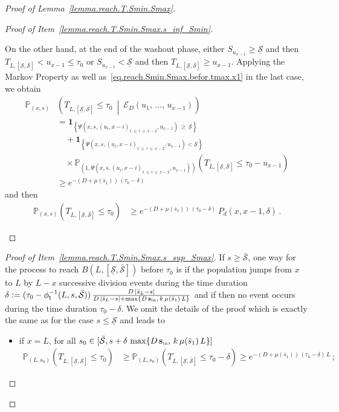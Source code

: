 \documentclass[AHL,Unicode,longabstracts,published]{cedram}
\newcommand{\PP}{\mathbb{P}}
\newcommand{\clE}{\mathcal{E}}
\newcommand{\Sin}{{\mathbf s}_{\textrm{\tiny\rm in}}}
\newcommand{\Smin}{\underline{\mathcal{S}}}
\newcommand{\Smax}{\bar{\mathcal{S}}}
\newcommand{\barmu}{\mu(\bar s_1)}
\newcommand{\phit}{\phi_\textsf{t}^{-1}}
\newcommand{\1}{\mathbf{1}}
\begin{document}
\begin{proof}[Proof of Lemma~\ref{lemma.reach.T.Smin.Smax}]
\begin{proof}[{Proof of Item~\eqref{lemma.reach.T.Smin.Smax.s_inf_Smin}}]
\begin{itemize}
On the other hand, at the end of the washout phase, either $S_{u_{x-1}}\geq \Smin$ and then $T_{L,[\Smin,\Smax]}< u_{x-1}\leq\tau_0$ or $S_{u_{x-1}}< \Smin$ and then $T_{L,[\Smin,\Smax]}\geq u_{x-1}$. Applying the Markov Property as well as~\eqref{eq.reach.Smin.Smax.befor.tmax.x1} in the last case, we obtain
\begin{align*}
\PP_{(x,s)}
&\left(T_{L,\left[\Smin,\Smax\right]}\leq\tau_0 \ \middle| \ \clE_D\left(u_1,\,\dots,\,u_{x-1}\right) \right)
\\
&= \1_{\left\{\Psi\left(x,s,(u_i,x-i)_{1\,\leq\,i\,\leq\,x-2},u_{x-1}\right)\,\geq\,\Smin\right\}}\\
&\quad + \1_{\left\{\Psi\left(x,s,(u_i,x-i)_{1\,\leq\,i\,\leq \,x-2},u_{x-1}\right)< \Smin\right\}}\,
\\
&\quad
\times \PP_{\left(1,\Psi\left(x,s,(u_i,x-i)_{1\,\leq\,i\,\leq\,x-2},u_{x-1}\right)\right)}
\left(T_{L,[\Smin,\Smax]}\leq\tau_0-u_{x-1}\right)
\\ 
&\geq e^{-(D+\barmu)\,(\tau_0-\delta)}
\end{align*}
and then
\begin{align}\label{eq.reach.Smin.Smax.befor.tmax.xlarger1}
\PP_{(x,s)}\left(T_{L,[\Smin,\Smax]}\leq \tau_0\right) &\geq e^{-(D+\barmu)\,(\tau_0-\delta)}\,P_d(x,x-1,\delta)\,.
\end{align}
\end{itemize}\let\qed\relax
\end{proof}
\begin{proof}[{Proof of Item~\eqref{lemma.reach.T.Smin.Smax.s_sup_Smax}}] If $s \geq \Smax$, one way for the process to reach $B(L,[\Smin,\Smax])$ before $\tau_0$ is if the population jumps from $x$ to $L$ by $L-x$ successive division events during the time duration $\delta:=(\tau_0-\phit(L, s,\Smax))\,\frac{D\,|\bar s_L-s|}{D\,|\bar s_L-s|+\max\{D\,\Sin,\,k\,\barmu\,L\}}$ and if then no event occurs during the time duration $\tau_0-\delta$. We omit the details of the proof which is exactly the same as for the case $s\leq \Smin$ and leads to
\begin{itemize}
\item if $x=L$, for all $s_0 \in [\Smax,s+\delta\,\max\{D\,\Sin,\,k\,\barmu\,L\}]$
\begin{align*}
\PP_{(L,s_0)}\left(T_{L,[\Smin,\Smax]}\leq \tau_0 \right) &\geq
\PP_{(L,s_0)}\left(T_{L,[\Smin,\Smax]}\leq \tau_0-\delta \right)
\geq e^{-(D+\barmu)\,(\tau_0-\delta)\,L}\,;
\end{align*}


\end{itemize}
\end{proof}
\end{proof}
\end{document}
